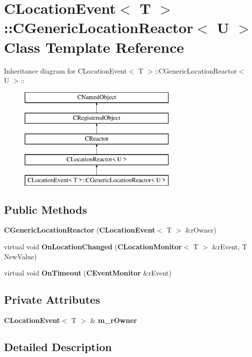 \section{CLocation\-Event$<$ T $>$::CGeneric\-Location\-Reactor$<$ U $>$  Class Template Reference}
\label{classCLocationEvent_1_1CGenericLocationReactor}
Inheritance diagram for CLocation\-Event$<$ T $>$::CGeneric\-Location\-Reactor$<$ U $>$::\begin{figure}[H]
\begin{center}
\leavevmode
\includegraphics[height=5cm]{classCLocationEvent_1_1CGenericLocationReactor}
\end{center}
\end{figure}
\subsection*{Public Methods}
\begin{CompactItemize}
\item 
{\bf CGeneric\-Location\-Reactor} ({\bf CLocation\-Event}$<$ T $>$ \&r\-Owner)
\item 
virtual void {\bf On\-Location\-Changed} ({\bf CLocation\-Monitor}$<$ T $>$ \&r\-Event, T New\-Value)
\item 
virtual void {\bf On\-Timeout} ({\bf CEvent\-Monitor} \&r\-Event)
\end{CompactItemize}
\subsection*{Private Attributes}
\begin{CompactItemize}
\item 
{\bf CLocation\-Event}$<$ T $>$ \& {\bf m\_\-r\-Owner}
\end{CompactItemize}


\subsection{Detailed Description}

